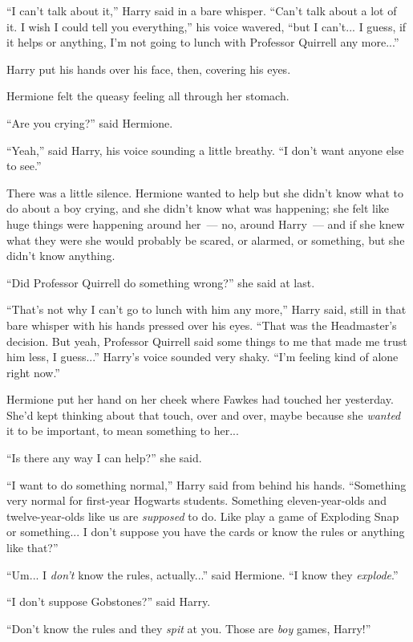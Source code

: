 ``I can't talk about it,'' Harry said in a bare whisper. ``Can't talk about a lot of it. I wish I could tell you everything,'' his voice wavered, ``but I can't... I guess, if it helps or anything, I'm not going to lunch with Professor Quirrell any more...''

Harry put his hands over his face, then, covering his eyes.

Hermione felt the queasy feeling all through her stomach.

``Are you crying?'' said Hermione.

``Yeah,'' said Harry, his voice sounding a little breathy. ``I don't want anyone else to see.''

There was a little silence. Hermione wanted to help but she didn't know what to do about a boy crying, and she didn't know what was happening; she felt like huge things were happening around her~--- no, around Harry~--- and if she knew what they were she would probably be scared, or alarmed, or something, but she didn't know anything.

``Did Professor Quirrell do something wrong?'' she said at last.

``That's not why I can't go to lunch with him any more,'' Harry said, still in that bare whisper with his hands pressed over his eyes. ``That was the Headmaster's decision. But yeah, Professor Quirrell said some things to me that made me trust him less, I guess...'' Harry's voice sounded very shaky. ``I'm feeling kind of alone right now.''

Hermione put her hand on her cheek where Fawkes had touched her yesterday. She'd kept thinking about that touch, over and over, maybe because she \emph{wanted} it to be important, to mean something to her...

``Is there any way I can help?'' she said.

``I want to do something normal,'' Harry said from behind his hands. ``Something very normal for first-year Hogwarts students. Something eleven-year-olds and twelve-year-olds like us are \emph{supposed} to do. Like play a game of Exploding Snap or something... I don't suppose you have the cards or know the rules or anything like that?''

``Um... I \emph{don't} know the rules, actually...'' said Hermione. ``I know they \emph{explode}.''

``I don't suppose Gobstones?'' said Harry.

``Don't know the rules and they \emph{spit} at you. Those are \emph{boy} games, Harry!''

